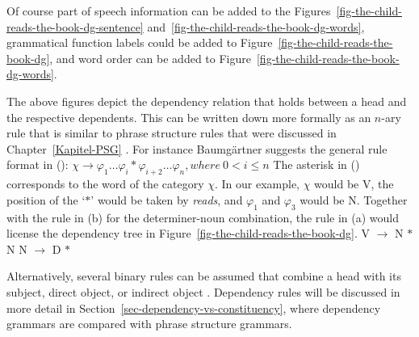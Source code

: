 Of course part of speech information can be added to the Figures~\ref{fig-the-child-reads-the-book-dg-sentence}
and~\ref{fig-the-child-reads-the-book-dg-words}, grammatical function labels could be added to
Figure~\ref{fig-the-child-reads-the-book-dg}, and word order can be added to Figure~\ref{fig-the-child-reads-the-book-dg-words}.


The above figures depict the dependency relation that holds between a head and the respective
dependents. This can be written down more formally as an $n$-ary rule\label{page-rule-format-dg} that is similar to phrase
structure rules that were discussed in Chapter~\ref{Kapitel-PSG} \parencites[]{Gaifman65a}[]{Hays64a-u}[]{Baumgaertner70a}[Section~4.1]{Heringer96a-u}. For instance Baumgärtner suggests the
general rule format in ():
\ea
$\chi \to \varphi_1 \ldots \varphi_i * \varphi_{i+2} \ldots \varphi_n, where~0 < i \leq n$
\z
The asterisk in () corresponds to the word of the category $\chi$. In our example, $\chi$
would be V, the position of the `$*$' would be taken by \emph{reads}, and $\varphi_1$ and
$\varphi_3$ would be N. Together with the rule in (b) for the determiner-noun combination, the rule in (a) would license
the dependency tree in Figure~\ref{fig-the-child-reads-the-book-dg}.%
\eal
\ex V $\to$ N $*$ N
\ex N $\to$ D $*$
\zl

\noindent
Alternatively, several binary rules can be assumed that combine a head with
its subject, direct object, or indirect object \citep{Kahane2009a}. Dependency rules will be discussed in
more detail in Section~\ref{sec-dependency-vs-constituency}, where dependency grammars are compared with phrase structure grammars.






